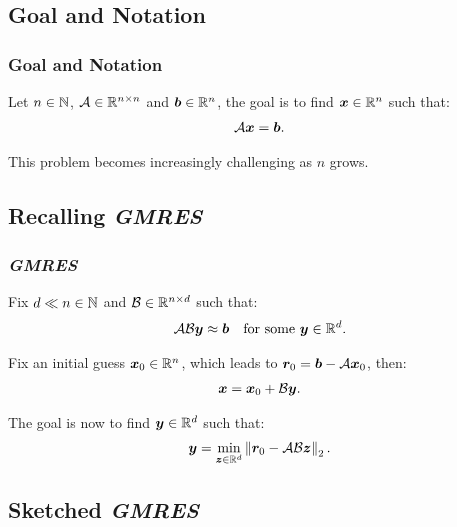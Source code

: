 \subsection{Goal and Notation}

\begin{frame}
    \frametitle{Goal and Notation}

    Let $n \in \mathbb{N}$,  $\mathcal{A} \in \mathbb{R}^{n \times n}$ and $\bm{b} \in \mathbb{R}^{n}$, the goal is to find $\bm{x} \in \mathbb{R}^{n}$ such that:
    \begin{align}
        \mathcal{A} \bm{x} = \bm{b}. \label{eq:system}
    \end{align}

    This problem becomes increasingly challenging as $n$ grows.

\end{frame}

\subsection{Recalling \textit{GMRES}}

\begin{frame}
    \frametitle{\textit{GMRES}}

    Fix $d \ll n \in \mathbb{N}$ and $\mathcal{B} \in \mathbb{R}^{n \times d}$ such that:
    \begin{align}
        \mathcal{A} \mathcal{B} \bm{y} &\approx \bm{b} &\text{for some } \bm{y} \in \mathbb{R}^{d}.
    \end{align}

    Fix an initial guess $\bm{x}_0 \in \mathbb{R}^{n}$, which leads to $\bm{r}_0 = \bm{b} - \mathcal{A} \bm{x}_0$, then:
    \begin{align}
        \bm{x} = \bm{x}_0 + \mathcal{B} \bm{y}.
    \end{align}

    The goal is now to find $\bm{y} \in \mathbb{R}^{d}$ such that:
    \begin{align}
        \bm{y} = \min_{\bm{z} \in \mathbb{R}^{d}} \left\lVert \bm{r}_0 - \mathcal{A} \mathcal{B} \bm{z} \right\rVert_2. \label{eq:min_problem}
    \end{align}

\end{frame}

\subsection{Sketched \textit{GMRES}}

